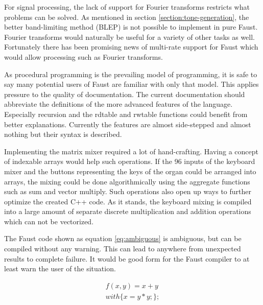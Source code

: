 \documentclass[11pt,a4paper]{article}
\begin{document}
For signal processing, the lack of support for Fourier transforms restricts what problems can be solved. As mentioned in section \ref{section:tone-generation}, the better band-limiting method (BLEP) is not possible to implement in pure Faust. Fourier transforms would naturally be useful for a variety of other tasks as well. Fortunately there has been promising news of multi-rate support for Faust which would allow processing such as Fourier transforms.

As procedural programming is the prevailing model of programming, it is safe to say many potential users of Faust are familiar with only that model. This applies pressure to the quality of documentation. The current documentation should abbreviate the definitions of the more advanced features of the language. Especially recursion and the rdtable and rwtable functions could benefit from better explanations. Currently the features are almost side-stepped and almost nothing but their syntax is described.

Implementing the matrix mixer required a lot of hand-crafting. Having a concept of indexable arrays would help such operations. If the 96 inputs of the keyboard mixer and the buttons representing the keys of the organ could be arranged into arrays, the mixing could be done algorithmically using the aggregate functions such as sum and vector multiply. Such operations also open up ways to further optimize the created C++ code. As it stands, the keyboard mixing is compiled into a large amount of separate discrete multiplication and addition operations which can not be vectorized.

The Faust code shown as equation \ref{eq:ambiguous} is ambiguous, but can be compiled without any warning. This can lead to anywhere from unexpected results to complete failure. It would be good form for the Faust compiler to at least warn the user of the situation.

\begin{equation}
\label{eq:ambiguous}
\begin{split}
f(x , y) = x + y\\
with \{ x = y * y; \};\\
\end{split}
\end{equation}



\end{document}
